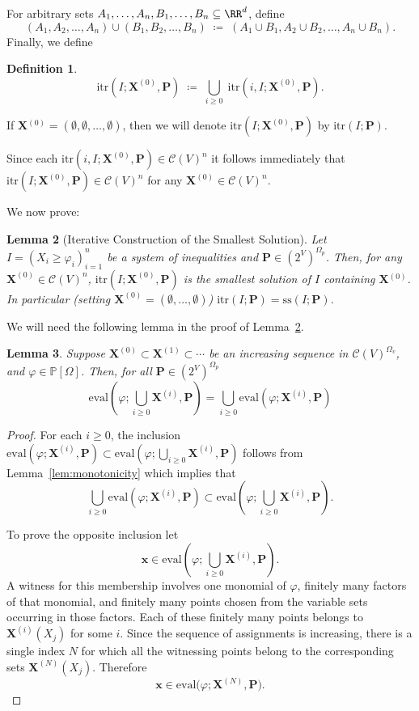 \documentclass[10pt]{amsart}
\theoremstyle{plain}
\newtheorem{lemma}{Lemma}[section]
\theoremstyle{definition}
\newtheorem{definition}[lemma]{Definition}
\providecommand{\cC}[0]{\ensuremath{\mathcal C}\xspace}
\providecommand{\bP}[0]{\ensuremath{\mathbf P}\xspace}
\providecommand{\bX}[0]{\ensuremath{\mathbf X}\xspace}
\let\geq\geqslant
\providecommand{\defeq}[0]{\ensuremath{\;\coloneqq\;}\xspace}
\providecommand{\p}[1]{\ensuremath{^{\left(#1\right)}}\xspace}
\providecommand{\convset}[0]{\ensuremath{\cC}\xspace}
\providecommand{\ssol}{\ensuremath{\mathrm{ss}}\xspace}
\providecommand{\evalmap}[0]{\ensuremath{\mathrm{eval}}\xspace}
\providecommand{\itr}[0]{\ensuremath{\mathrm{itr}}\xspace}
\begin{document}
For arbitrary sets $A_1, \dotsc, A_n,B_1,\dotsc, B_n\subseteq \RR^d$, define
    $$(A_1, A_2, \dotsc, A_n) \cup (B_1, B_2, \dotsc, B_n) \defeq \left( A_1\cup B_1, A_2\cup B_2, \dotsc, A_n\cup B_n\right).$$
Finally,  we define
\begin{definition}
\label{def:itr2}
    \begin{equation}
        \label{eqn:itr}
        \itr(I;\bX^{(0)},\bP) \defeq \bigcup\limits_{i\geq 0} \; \itr(i,I;\bX^{(0)},\bP).
    \end{equation}
    
    If
    $\bX\p 0= (\emptyset,\emptyset,\dotsc,\emptyset)$, then we will denote
    $\itr(I;\bX^{(0)},\bP)$ by $\itr(I;\bP)$.
\end{definition}
    
Since each $\itr(i,I;\bX^{(0)},\bP)\in\convset(V)^n$
it follows immediately that
$\itr(I;\bX^{(0)},\bP) \in \convset(V)^n$ for any $\bX^{(0)} \in \convset(V)^n$.

We now prove:
\begin{lemma}[Iterative Construction of the Smallest Solution]
\label{lem:itr-char}
\label{lem:itr2}
    Let $I = \left(X_i \geq \varphi_i\right)_{i=1}^n $ be a  system of inequalities and $\bP \in (2^V)^{\Omega_p}$. Then, for any $\bX^{(0)} \in \convset(V)^n$,
     $\itr(I;\bX^{(0)},\bP)$ is the smallest solution of $I$ containing $\bX\p 0$. 
    In particular (setting $\bX^{(0)} = (\emptyset,\ldots,\emptyset)$) $\itr(I;\bP) = \ssol(I;\bP)$.
\end{lemma}
We will need the following lemma in the proof of Lemma~\ref{lem:itr-char}.

\begin{lemma}
\label{lem:finitary-continuity}
    Suppose $\bX^{(0)} \subset \bX^{(1)} \subset \cdots$ be an increasing sequence in $\convset(V)^{\Omega_v}$,
    and $\varphi \in \mathbb{P}[\Omega]$. Then, for all $\bP \in (2^V)^{\Omega_p}$
    \[
    \evalmap(\varphi; \bigcup_{i \geq 0} \bX^{(i)},\bP) = \bigcup_{i \geq 0} \evalmap(\varphi;  \bX^{(i)},\bP)
    \]
\end{lemma}

\begin{proof}
    For each $i \geq 0$, the inclusion
    $ \evalmap(\varphi;  \bX^{(i)},\bP) \subset \evalmap(\varphi; \bigcup_{i \geq 0} \bX^{(i)},\bP)$
    follows from Lemma~\ref{lem:monotonicity} which implies that
    \[
    \bigcup_{i \geq 0} \evalmap(\varphi;  \bX^{(i)},\bP) \subset 
    \evalmap(\varphi; \bigcup_{i \geq 0} \bX^{(i)},\bP).
    \]

To prove the opposite inclusion    
let
\[
\mathbf{x} \in
\evalmap
\left(
\varphi;
\bigcup_{i\geq 0}\mathbf X^{(i)},
\mathbf P
\right).
\]
A witness for this membership involves one monomial of \(\varphi\),
finitely many factors of that monomial, and finitely many points chosen
from the variable sets occurring in those factors. Each of these
finitely many points belongs to \(\bX^{(i)}(X_j)\) for some
\(i\). Since the sequence of assignments is increasing, there is a
single index \(N\) for which all the witnessing points belong to the
corresponding sets \(\bX^{(N)}(X_j)\). Therefore
\[
\mathbf{x} \in
\evalmap
\bigl(
\varphi;\bX^{(N)},\bP
\bigr).
\]
\end{proof}
\end{document}
